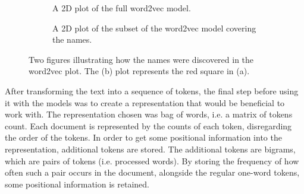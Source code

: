 \begin{figure}
    \begin{subfigure}[b]{\textwidth}
        \centering
        \caption{A 2D plot of the full word2vec model.}
    \end{subfigure}
    \quad
    \begin{subfigure}[b]{\textwidth}
        \centering
        \caption{A 2D plot of the subset of the word2vec model covering the names.}
    \end{subfigure}
    \caption{Two figures illustrating how the names were discovered in the word2vec plot. The (b) plot represents the red square in (a).}
    \label{fig:word2vec-names-overview}
\end{figure}


After transforming the text into a sequence of tokens, the final step before using it with the models was to create a representation that would be beneficial to work with.
The representation chosen was bag of words, i.e. a matrix of tokens count.
Each document is represented by the counts of each token, disregarding the order of the tokens.
In order to get some positional information into the representation, additional tokens are stored. 
The additional tokens are bigrams, which are pairs of tokens (i.e. processed words).
By storing the frequency of how often such a pair occurs in the document, alongside the regular one-word tokens, some positional information is retained.

